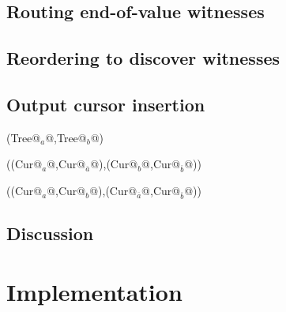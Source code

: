 \documentclass[preprint,10pt,nocopyrightspace,nonatbib]{./bibs/sigplanconf}
\begin{document}
\subsection{Routing end-of-value witnesses}


\subsection{Reordering to discover witnesses}

\note{}



\subsection{Output cursor insertion}


\newcommand{\END}[1]{\ensuremath{\overline{#1}}}


\begin{code}
  (Tree@$_a$@,Tree@$_b$@)

  ((Cur@$_a$@,Cur@$_{\END{a}}$@),(Cur@$_b$@,Cur@$_{\END{b}}$@))

  ((Cur@$_a$@,Cur@$_b$@),(Cur@$_{\END{a}}$@,Cur@$_{\END{b}}$@))
\end{code}


\subsection{Discussion}




\section{Implementation}
\end{document}
